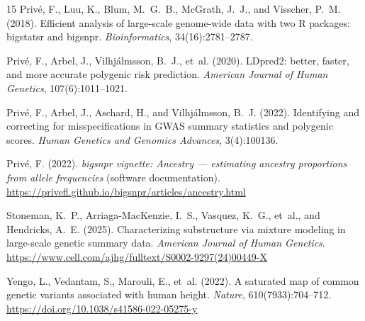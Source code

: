 \documentclass[11pt,a4paper]{article}
\begin{document}
\begin{thebibliography}{15}
Priv\'e, F., Luu, K., Blum, M.~G.~B., McGrath, J.~J., and
Visscher, P.~M. (2018).
Efficient analysis of large-scale genome-wide data with two R packages:
bigstatsr and bigsnpr.
\emph{Bioinformatics}, 34(16):2781--2787.

Priv\'e, F., Arbel, J., Vilhj\'almsson, B.~J., et~al. (2020).
LDpred2: better, faster, and more accurate polygenic risk prediction.
\emph{American Journal of Human Genetics}, 107(6):1011--1021.

Priv\'e, F., Arbel, J., Aschard, H., and Vilhj\'almsson, B.~J. (2022).
Identifying and correcting for misspecifications in GWAS summary
statistics and polygenic scores.
\emph{Human Genetics and Genomics Advances}, 3(4):100136.

Priv\'e, F. (2022).
\emph{bigsnpr vignette: Ancestry --- estimating ancestry proportions from
allele frequencies} (software documentation).
\url{https://privefl.github.io/bigsnpr/articles/ancestry.html}

Stoneman, K.~P., Arriaga-MacKenzie, I.~S., Vasquez, K.~G., et~al., and
Hendricks, A.~E. (2025).
Characterizing substructure via mixture modeling in large-scale genetic
summary data.
\emph{American Journal of Human Genetics}.
\url{https://www.cell.com/ajhg/fulltext/S0002-9297(24)00449-X}

Yengo, L., Vedantam, S., Marouli, E., et~al. (2022).
A saturated map of common genetic variants associated with human height.
\emph{Nature}, 610(7933):704--712.
\url{https://doi.org/10.1038/s41586-022-05275-y}

\end{thebibliography}
\end{document}
